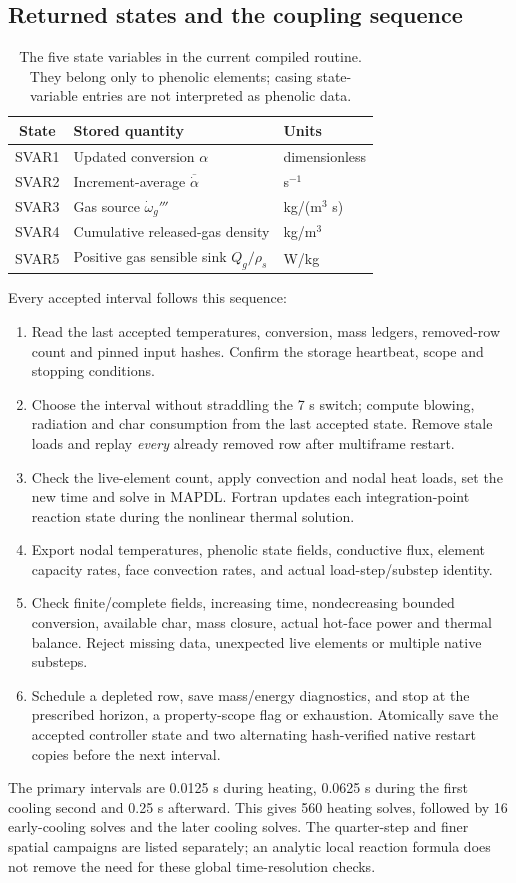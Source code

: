 \documentclass[oneside,openany]{amsdtx}
\begin{document}
\subsection{Returned states and the coupling sequence}
\begin{table}[H]\centering\small
\begin{tabular}{cll}\toprule
State & Stored quantity & Units\\\midrule
SVAR1 & Updated conversion $\alpha$ & dimensionless\\
SVAR2 & Increment-average $\overline{\dot\alpha}$ & s$^{-1}$\\
SVAR3 & Gas source $\dot\omega_g'''$ & kg/(m$^3$ s)\\
SVAR4 & Cumulative released-gas density & kg/m$^3$\\
SVAR5 & Positive gas sensible sink $Q_g/\rho_s$ & W/kg\\\bottomrule
\end{tabular}\caption{The five state variables in the current compiled routine. They belong only to phenolic elements; casing state-variable entries are not interpreted as phenolic data.}\end{table}
Every accepted interval follows this sequence:
\begin{enumerate}[leftmargin=*,itemsep=2pt]
\item Read the last accepted temperatures, conversion, mass ledgers, removed-row count and pinned input hashes. Confirm the storage heartbeat, scope and stopping conditions.
\item Choose the interval without straddling the 7 s switch; compute blowing, radiation and char consumption from the last accepted state. Remove stale loads and replay \emph{every} already removed row after multiframe restart.
\item Check the live-element count, apply convection and nodal heat loads, set the new time and solve in MAPDL. Fortran updates each integration-point reaction state during the nonlinear thermal solution.
\item Export nodal temperatures, phenolic state fields, conductive flux, element capacity rates, face convection rates, and actual load-step/substep identity.
\item Check finite/complete fields, increasing time, nondecreasing bounded conversion, available char, mass closure, actual hot-face power and thermal balance. Reject missing data, unexpected live elements or multiple native substeps.
\item Schedule a depleted row, save mass/energy diagnostics, and stop at the prescribed horizon, a property-scope flag or exhaustion. Atomically save the accepted controller state and two alternating hash-verified native restart copies before the next interval.
\end{enumerate}
The primary intervals are 0.0125 s during heating, 0.0625 s during the first cooling second and 0.25 s afterward. This gives 560 heating solves, followed by 16 early-cooling solves and the later cooling solves. The quarter-step and finer spatial campaigns are listed separately; an analytic local reaction formula does not remove the need for these global time-resolution checks.
\end{document}
